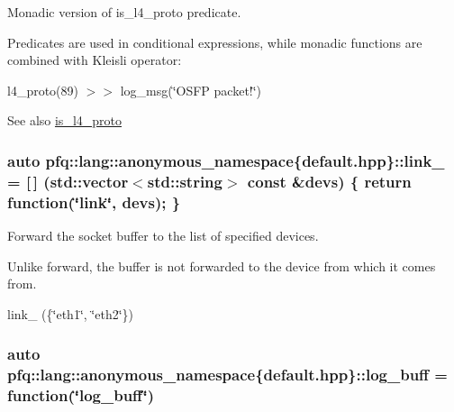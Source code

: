 Monadic version of {\ttfamily is\+\_\+l4\+\_\+proto} predicate. 

Predicates are used in conditional expressions, while monadic functions are combined with Kleisli operator\+:

l4\+\_\+proto(89) $>$$>$ log\+\_\+msg(\char`\"{}\+O\+S\+F\+P packet!\char`\"{})

\begin{DoxySeeAlso}{See also}
\hyperlink{namespacepfq_1_1lang_1_1anonymous__namespace_02default_8hpp_03_a9d06d4dedca1ebdc3b270cb2f3e9e42b}{is\+\_\+l4\+\_\+proto} 
\end{DoxySeeAlso}
\subsubsection[{\texorpdfstring{link\+\_\+}{link_}}]{\setlength{\rightskip}{0pt plus 5cm}auto pfq\+::lang\+::anonymous\+\_\+namespace\{default.\+hpp\}\+::link\+\_\+ = \mbox{[}$\,$\mbox{]} (std\+::vector$<$std\+::string$>$ const \&devs) \{ return {\bf function}(\char`\"{}link\char`\"{}, devs); \}}\hypertarget{namespacepfq_1_1lang_1_1anonymous__namespace_02default_8hpp_03_aaad98f847b8e4c53a5ddec3c93b05296}{}\label{namespacepfq_1_1lang_1_1anonymous__namespace_02default_8hpp_03_aaad98f847b8e4c53a5ddec3c93b05296}


Forward the socket buffer to the list of specified devices. 

Unlike forward, the buffer is not forwarded to the device from which it comes from.

link\+\_\+ (\{\char`\"{}eth1\char`\"{}, \char`\"{}eth2\char`\"{}\}) 
\subsubsection[{\texorpdfstring{log\+\_\+buff}{log_buff}}]{\setlength{\rightskip}{0pt plus 5cm}auto pfq\+::lang\+::anonymous\+\_\+namespace\{default.\+hpp\}\+::log\+\_\+buff = {\bf function}(\char`\"{}log\+\_\+buff\char`\"{})}\hypertarget{namespacepfq_1_1lang_1_1anonymous__namespace_02default_8hpp_03_ac16d4c4b496e6e882901d84ded462101}{}\label{namespacepfq_1_1lang_1_1anonymous__namespace_02default_8hpp_03_ac16d4c4b496e6e882901d84ded462101}


